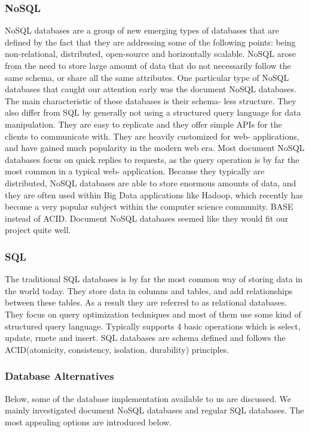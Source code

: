 \subsubsection*{NoSQL}
NoSQL databases are a group of new emerging types of databases that are defined by the fact that they are addressing some of the following points: being non-relational, distributed, open-source and horizontally scalable\cite{nosql}. NoSQL arose from the need to store large amount of data that do not necessarily follow the same schema, or share all the same attributes. One particular type of NoSQL databases that caught our attention early was the document NoSQL databases. The main characteristic of these databases is their schema- less structure. They also differ from SQL by generally not using a structured query language for data manipulation. They are easy to replicate and they offer simple APIs for the clients to communicate with. They are heavily customized for web- applications, and have gained much popularity in the modern web era. Most document NoSQL databases focus on quick replies to requests, as the query operation is by far the most common in a typical web- application. Because they typically are distributed, NoSQL databases are able to store enormous amounts of data, and they are often used within Big Data\cite{bigdata} applications like Hadoop\cite{hadoop}, which recently has become a very popular subject within the computer science community.
BASE \cite{pritchett} instead of ACID.
Document NoSQL databases seemed like they would fit our project quite well.
\cite{nosql-databases, nosql-article}

\subsubsection*{SQL}
The traditional SQL databases is by far the most common way of storing data in the world today. They store data in columns and tables, and add relationships between these tables. As a result they are referred to as relational databases. They focus on query optimization techniques and most of them use some kind of structured query language. Typically supports 4 basic operations which is select, update, rmete and insert. SQL databases are schema defined and follows the ACID(atomicity, consistency, isolation, durability) principles.
\cite{ramakrishnan2003database}

\subsubsection{Database Alternatives}
Below, some of the database implementation available to us are discussed. We mainly investigated document NoSQL databases and regular SQL databases. The most appealing options are introduced below.

